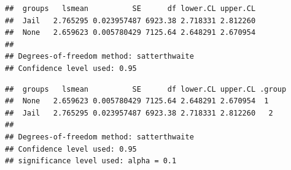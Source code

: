 \begin{frame}[fragile]

\begin{Shaded}
\begin{Highlighting}[]
\StringTok{ }\NormalTok{))}
\end{Highlighting}
\end{Shaded}

\begin{verbatim}
##  groups   lsmean          SE      df lower.CL upper.CL
##  Jail   2.765295 0.023957487 6923.38 2.718331 2.812260
##  None   2.659623 0.005780429 7125.64 2.648291 2.670954
## 
## Degrees-of-freedom method: satterthwaite 
## Confidence level used: 0.95
\end{verbatim}

\end{frame}

\begin{frame}[fragile]

\begin{Shaded}
\begin{Highlighting}[]
\NormalTok{)}
\end{Highlighting}
\end{Shaded}

\begin{verbatim}
##  groups   lsmean          SE      df lower.CL upper.CL .group
##  None   2.659623 0.005780429 7125.64 2.648291 2.670954  1    
##  Jail   2.765295 0.023957487 6923.38 2.718331 2.812260   2   
## 
## Degrees-of-freedom method: satterthwaite 
## Confidence level used: 0.95 
## significance level used: alpha = 0.1
\end{verbatim}

\end{frame}

